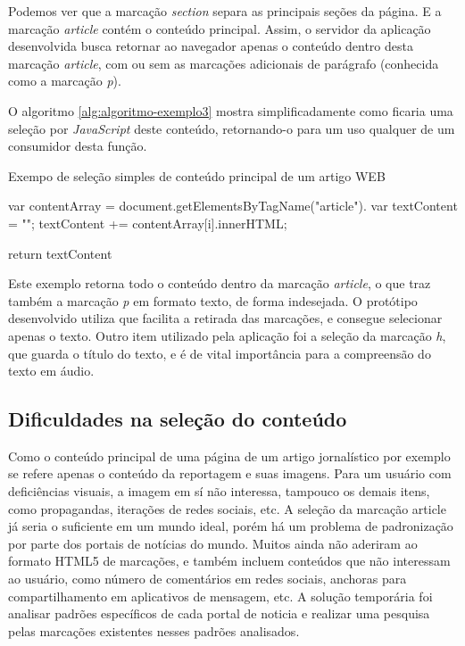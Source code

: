 \documentclass[
	12pt,				%
	oneside,			%
	a4paper,			%
	english,			%
	brazil				%
	]{abntex2ppgsi}
\begin{document}
Podemos ver que a marcação \textit{section} separa as principais seções da página. E a marcação \textit{article} contém o conteúdo principal. Assim, o servidor da aplicação desenvolvida busca retornar ao navegador apenas o conteúdo dentro desta marcação \textit{article}, com ou sem as marcações adicionais de parágrafo (conhecida como a marcação \textit{p}).
 
O algoritmo \ref{alg:algoritmo-exemplo3} mostra simplificadamente como ficaria uma seleção por \textit{JavaScript} deste conteúdo, retornando-o para um uso qualquer de um consumidor desta função.

\begin{algorithm}[htbp]
	\caption{Exempo de seleção simples de conteúdo principal de um artigo WEB}
	\label{alg:algoritmo-exemplo3}
	\begin{algorithmic}
		\State var contentArray = document.getElementsByTagName("article").
		\State var textContent = "";
		\State	textContent += contentArray[i].innerHTML;
		\EndFor
		
		\Return return textContent
		\EndFunction
	\end{algorithmic}
\end{algorithm}

Este exemplo retorna todo o conteúdo dentro da marcação \textit{article}, o que traz também a marcação \textit{p} em formato texto, de forma indesejada. O protótipo desenvolvido utiliza  que facilita a retirada das marcações, e consegue selecionar apenas o texto. Outro item utilizado pela aplicação foi a seleção da marcação \textit{h}, que guarda o título do texto, e é de vital importância para a compreensão do texto em áudio. 

\subsection{Dificuldades na seleção do conteúdo}

Como o conteúdo principal de uma página de um artigo jornalístico por exemplo se refere apenas o conteúdo da reportagem e suas imagens. Para um usuário com deficiências visuais, a imagem em sí não interessa, tampouco os demais itens, como propagandas, iterações de redes sociais, etc. A seleção da marcação article já seria o suficiente em um mundo ideal, porém há um problema de padronização por parte dos portais de notícias do mundo. Muitos ainda não aderiram ao formato HTML5 de marcações, e também incluem conteúdos que não interessam ao usuário, como número de comentários em redes sociais, anchoras para compartilhamento em aplicativos de mensagem, etc. A solução temporária foi analisar padrões específicos de cada portal de noticia e realizar uma pesquisa pelas marcações existentes nesses padrões analisados. 
\end{document}
